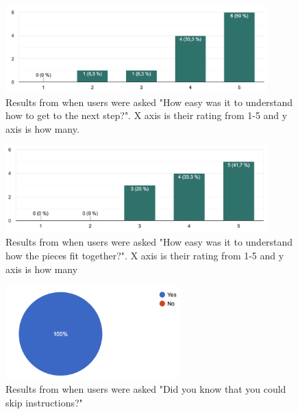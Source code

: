 \begin{figure}[hbtp]
\begin{center}
\includegraphics[width = 0.9\textwidth]{./Images/easyToGetToNext.png}
\caption{Results from when users were asked "How easy was it to understand how to get to the next step?". X axis is their rating from 1-5 and y axis is how many.}
\label{fig:question1}
\end{center}
\end{figure}

\begin{figure}[hbtp]
\begin{center}
\includegraphics[width = 0.9\textwidth]{./Images/easyToUnderstand.png}
\caption{Results from when users were asked "How easy was it to understand how the pieces fit together?". X axis is their rating from 1-5 and y axis is how many}
\label{fig:question2}
\end{center}
\end{figure}

\begin{figure}[hbtp]
\begin{center}
\includegraphics[width = 0.6\textwidth]{./Images/knowToSkip.png}
\caption{Results from when users were asked "Did you know that you could skip instructions?"}
\label{fig:question3}
\end{center}
\end{figure}


